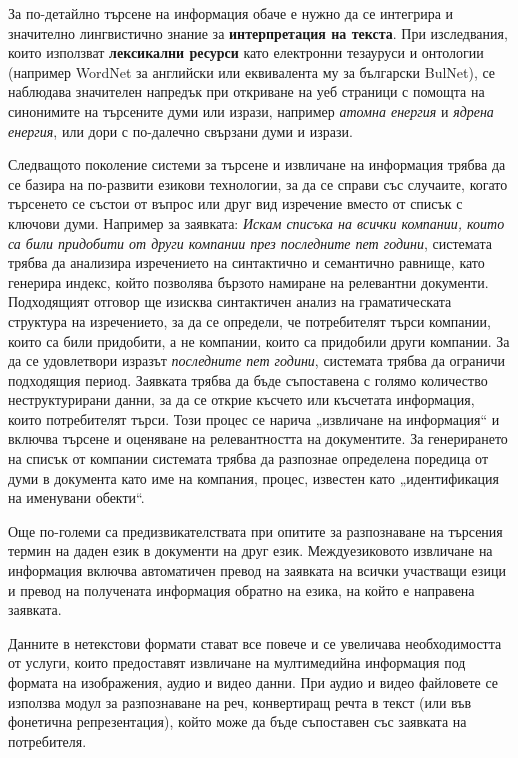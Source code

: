 \begin{multicols}{2}
  За по-детайлно търсене на информация обаче е нужно да
   се интегрира и значително лингвистично знание за \textbf{интерпретация на текста}. 
  При изследвания, които използват \textbf{лексикални ресурси} като електронни тезауруси и онтологии (например WordNet за английски или еквивалента му за български BulNet), се наблюдава значителен напредък при от\-криване на уеб
   страници с помощта на синонимите на търсените думи или изрази, например {\it атомна енергия} и {\it ядрена енергия}, или дори с по-далечно свързани думи и изрази.


  Следващото поколение системи за търсене и извличане на информация трябва да се базира на
   по-развити езикови технологии, за да се справи със случаите, когато търсенето се състои от въпрос или друг вид изречение вместо от списък с ключови думи. 
   Например за заявката: \textit{Искам списъка на всички компании, които
   са били придобити от други компании през последните пет
   години}, системата трябва да анализира  изречението на синтактично и семантично равнище, като генерира индекс, който позволява бързото намиране на релевантни документи. Подходящият отговор ще изисква синтактичен анализ на граматическата структура на изречението, за да се определи, че потребителят търси компании, които са били придобити, а не компании, които са придобили
   други компании. За да се удовлетвори изразът \textit{последните пет години}, системата трябва да ограничи подходящия период. Заявката трябва да бъде съпоставена с голямо количество неструктурирани данни, за да се
   открие късчето или късчетата информация, които потребителят търси. Този процес се нарича „извличане на информация“ и включва търсене и оценяване на релевантността на  документите. За генерирането на списък от компании системата трябва да разпознае определена поредица от думи
   в документа като име на компания, процес, известен като „идентификация на
   именувани обекти“.

  Още по-големи са предизвикателствата при опитите за разпознаване на търсения термин на даден език в документи на друг език. Междуезиковото извличане на информация включва автоматичен превод на заявката
   на всички участващи езици и превод на получената информация обратно на езика, на който е направена заявката.

  Данните в нетекстови формати стават все повече и се увеличава необходимостта от услуги, които предоставят извличане на мултимедийна информация под
   формата на изображения, аудио и видео данни. При аудио и видео файловете се използва модул за разпознаване
   на реч, конвертиращ речта в текст (или във
   фонетична репрезентация), който може да бъде
   съпоставен със заявката на потребителя.


\end{multicols}
